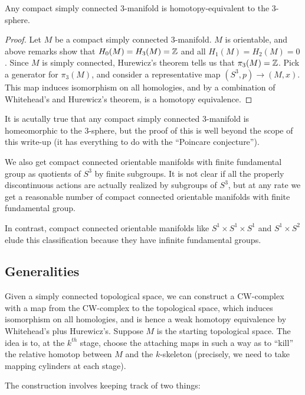 \documentclass[a4paper]{amsart}
\begin{document}
\begin{theorem}
  Any compact simply connected $3$-manifold is homotopy-equivalent to
  the $3$-sphere.
\end{theorem}

\begin{proof}
  Let $M$ be a compact simply connected $3$-manifold. $M$ is
  orientable, and above remarks show that $H_0(M) = H_3(M) = \mathbb{Z}$ and
  all $H_1(M) = H_2(M) = 0$. Since $M$ is simply connected, Hurewicz's
  theorem tells us that $\pi_3(M) = \mathbb{Z}$. Pick a generator for
  $\pi_3(M)$, and consider a representative map $(S^3,p) \to
  (M,x)$. This map induces isomorphism on all homologies, and by a
  combination of Whitehead's and Hurewicz's theorem, is a homotopy
  equivalence.
\end{proof}

It is acutally true that any compact simply connected $3$-manifold is
homeomorphic to the $3$-sphere, but the proof of this is well beyond
the scope of this write-up (it has everything to do with the
``Poincare conjecture'').

We also get compact connected orientable manifolds with finite
fundamental group as quotients of $S^3$ by finite subgroups. It is not
clear if all the properly discontinuous actions are actually realized
by subgroups of $S^3$, but at any rate we get a reasonable number of
compact connected orientable manifolds with finite fundamental group.

In contrast, compact connected orientable manifolds like $S^1 \times
S^1 \times S^1$ and $S^1 \times S^2$ elude this classification because
they have infinite fundamental groups.

\subsection{Generalities}

Given a simply connected topological space, we can construct a
CW-complex with a map from the CW-complex to the topological space,
which induces isomorphism on all homologies, and is hence a weak
homotopy equivalence by Whitehead's plus Hurewicz's. Suppose $M$ is
the starting topological space. The idea is to, at the $k^{th}$ stage,
choose the attaching maps in such a way as to ``kill'' the relative
homotop between $M$ and the $k$-skeleton (precisely, we need to take
mapping cylinders at each stage).

The construction involves keeping track of two things:
\end{document}

